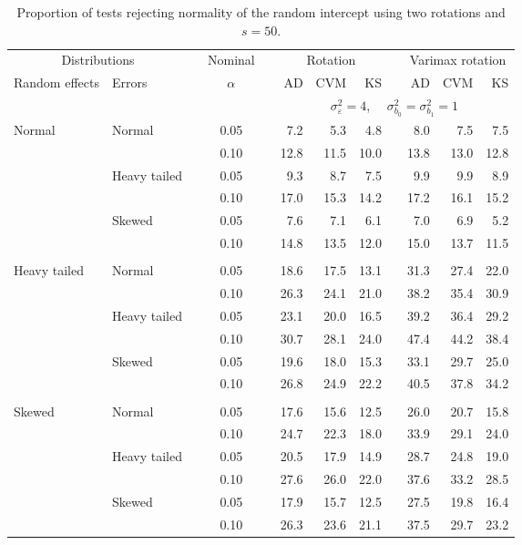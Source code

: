 \begin{table}[ht]
\centering
\caption{\label{tab:fixedsimb050} Proportion of tests rejecting normality of the random intercept using two rotations and $s = 50$.}
\begin{scriptsize}
\begin{tabular}{ll p{.1cm} c p{.1cm} rrr p{.1cm} rrr}
  \hline
  \multicolumn{2}{c}{Distributions}& & Nominal & &  \multicolumn{3}{c}{Rotation} & & \multicolumn{3}{c}{Varimax rotation} \\ \cline{1-2} \cline{6-8} \cline{10-12}   
  Random effects & Errors & & $\alpha$ & & AD & CVM & KS & & AD & CVM & KS \\ 
   \hline
& && && \multicolumn{7}{c}{$\sigma_{\varepsilon}^2 = 4$, \ \ $\sigma_{b_0}^2 = \sigma_{b_1}^2 = 1$} \\ \cline{6-12}
\rowcolor{gray!20}  Normal & Normal &  & 0.05 &  & 7.2 & 5.3 & 4.8 &  & 8.0 & 7.5 & 7.5 \\ 
\rowcolor{gray!20}   &  &  & 0.10 &  & 12.8 & 11.5 & 10.0 &  & 13.8 & 13.0 & 12.8 \\ 
\rowcolor{gray!20}   & Heavy tailed &  & 0.05 &  & 9.3 & 8.7 & 7.5 &  & 9.9 & 9.9 & 8.9 \\ 
\rowcolor{gray!20}   &  &  & 0.10 &  & 17.0 & 15.3 & 14.2 &  & 17.2 & 16.1 & 15.2 \\ 
\rowcolor{gray!20}   & Skewed &  & 0.05 &  & 7.6 & 7.1 & 6.1 &  & 7.0 & 6.9 & 5.2 \\ 
\rowcolor{gray!20}   &  &  & 0.10 &  & 14.8 & 13.5 & 12.0 &  & 15.0 & 13.7 & 11.5 \\ 
&&&&&&&&&&&\\
  Heavy tailed & Normal &  & 0.05 &  & 18.6 & 17.5 & 13.1 &  & 31.3 & 27.4 & 22.0 \\ 
   &  &  & 0.10 &  & 26.3 & 24.1 & 21.0 &  & 38.2 & 35.4 & 30.9 \\ 
   & Heavy tailed &  & 0.05 &  & 23.1 & 20.0 & 16.5 &  & 39.2 & 36.4 & 29.2 \\ 
   &  &  & 0.10 &  & 30.7 & 28.1 & 24.0 &  & 47.4 & 44.2 & 38.4 \\ 
   & Skewed &  & 0.05 &  & 19.6 & 18.0 & 15.3 &  & 33.1 & 29.7 & 25.0 \\ 
   &  &  & 0.10 &  & 26.8 & 24.9 & 22.2 &  & 40.5 & 37.8 & 34.2 \\ 
&&&&&&&&&&&\\
  Skewed & Normal &  & 0.05 &  & 17.6 & 15.6 & 12.5 &  & 26.0 & 20.7 & 15.8 \\ 
   &  &  & 0.10 &  & 24.7 & 22.3 & 18.0 &  & 33.9 & 29.1 & 24.0 \\ 
   & Heavy tailed &  & 0.05 &  & 20.5 & 17.9 & 14.9 &  & 28.7 & 24.8 & 19.0 \\ 
   &  &  & 0.10 &  & 27.6 & 26.0 & 22.0 &  & 37.6 & 33.2 & 28.5 \\ 
   & Skewed &  & 0.05 &  & 17.9 & 15.7 & 12.5 &  & 27.5 & 19.8 & 16.4 \\ 
   &  &  & 0.10 &  & 26.3 & 23.6 & 21.1 &  & 37.5 & 29.7 & 23.2 \\ 




\end{tabular}
\end{scriptsize}
\end{table}
